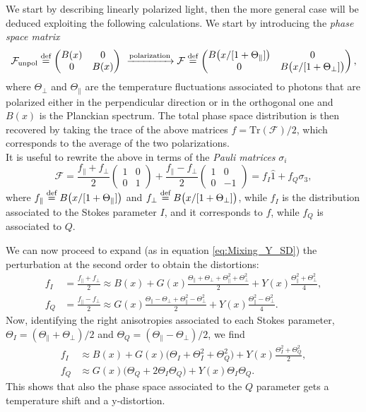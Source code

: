 We start by describing linearly polarized light, then the more general case will be deduced exploiting the following calculations. We start by introducing the \emph{phase space matrix}
\begin{equation*}
    \mathcal{F} _\text{unpol} \stackrel{\text{def}}{=}
    \begin{pmatrix}
        B(x) & 0 \\ 0 & B(x)
    \end{pmatrix}\ \xrightarrow{\text{polarization}}\mathcal{F}  \stackrel{\text{def}}{=}
    \begin{pmatrix}
        B\big(x/[1+\Theta_\parallel]\big) & 0 \\ 0 & B\big(x/[1+\Theta_\perp ]\big)
    \end{pmatrix},
\end{equation*}
where $\Theta_\perp$ and $\Theta_\parallel$ are the temperature fluctuations associated to photons that are polarized either in the perpendicular direction or in the orthogonal one and $B(x)$ is the Planckian spectrum. The total phase space distribution is then recovered by taking the trace of the above matrices $f=\text{Tr}(\mathcal{F} )/2$, which corresponds to the average of the two polarizations.\\
It is useful to rewrite the above in terms of the \emph{ Pauli matrices} $\sigma_i$
$$\mathcal{F} =\frac{f_\parallel+f_\perp}{2}\begin{pmatrix}
    1&0\\0&1
\end{pmatrix}+\frac{f_\parallel-f_\perp}{2}\begin{pmatrix}
    1&0\\0&-1
\end{pmatrix}=f_I\hat 1+f_Q\sigma_3, $$
where $f_\parallel\stackrel{\text{def}}{=} B\big(x/[1+\Theta_\parallel]\big)$ and $f_\perp\stackrel{\text{def}}{=} B\big(x/[1+\Theta_\perp]\big)$, while $f_I$ is the distribution associated to the Stokes parameter $I$, and it corresponds to $f$, while $f_Q$ is associated to $Q$.

We can now proceed to expand (as in equation \eqref{eq:Mixing_Y_SD}) the perturbation at the second order to obtain the distortions:
\begin{align*}
    f_I&=\frac{f_\parallel+f_\perp}{2}\approx B(x)+G(x)\frac{\Theta_\parallel+\Theta_\perp+\Theta^2_\parallel+\Theta^2_\perp}{2}+Y(x)\frac{\Theta^2_\parallel+\Theta^2_\perp}{4},\\
    f_Q&=\frac{f_\parallel-f_\perp}{2}\approx G(x)\frac{\Theta_\parallel-\Theta_\perp+\Theta^2_\parallel-\Theta^2_\perp}{2}+Y(x)\frac{\Theta^2_\parallel-\Theta^2_\perp}{4}.
\end{align*}
Now, identifying the right anisotropies associated to each Stokes parameter, $\Theta_I=(\Theta_\parallel+\Theta_\perp)/2$ and $\Theta_Q=(\Theta_\parallel-\Theta_\perp)/2$, we find
\begin{align*}
    f_I&\approx B(x)+G(x)\Big(\Theta_I+\Theta^2_I+\Theta^2_Q\Big)+Y(x)\frac{\Theta^2_I+\Theta^2_Q}{2},\\
    f_Q&\approx G(x)\Big(\Theta_Q+2\Theta_I\Theta_Q\Big)+Y(x)\Theta_I\Theta_Q.
\end{align*}
This shows that also the phase space associated to the $Q$ parameter gets a temperature shift and a y-distortion.

